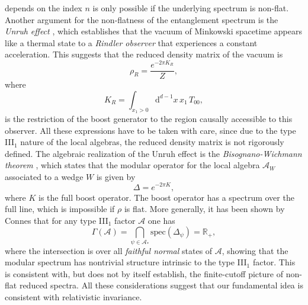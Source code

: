 \documentclass[aps,pra,reprint,superscriptaddress]{revtex4-2}
\newcommand{\cA}{{\mathcal A}}
\newcommand\D{\Delta}
\newcommand\G{\Gamma}
\renewcommand\r{\rho}
\newcommand\y{\psi}
\theoremstyle{definition}
\theoremstyle{remark}
\begin{document}
depends on the index $n$ is only possible if the underlying spectrum is
non-flat. Another argument for the non-flatness of the entanglement spectrum is
the \emph{Unruh effect} \cite{Unruh:1976db}, which establishes that the vacuum of
Minkowski spacetime appears like a thermal state to a \emph{Rindler observer} that
experiences a constant acceleration.
This suggests that the reduced density matrix 
of the vacuum is
\begin{equation}
    \r_R = \frac{e^{-2 \pi K_R}}{Z},
\end{equation}
where
\begin{equation}
    K_R = \int_{x_1>0} \text{d}^{d-1}x\, x_1\, T_{00},
\end{equation}
is the restriction of the boost generator to the region causally accessible to
this observer. All these expressions have to be taken with care, since due to
the type III$_1$ nature of the local algebras, the reduced density matrix is
not rigorously defined. The algebraic realization of the Unruh effect is the \emph{Bisognano-Wichmann
theorem} \cite{Bisognano:1976za}, which states that the modular operator for the local algebra $\cA_W$ associated to a wedge $W$
is given by
\begin{equation}
    \D = e^{-2\pi K},
\end{equation}
where $K$ is the full boost operator. The boost operator has a spectrum over
the full line, which is impossible if $\r$ is flat. More generally, it has been
shown by Connes \cite{Connes:1971,Connes:1973} that for any type III$_1$
factor $\cA$ one has
\begin{equation}
    \G(\cA) = \bigcap_{\y \in \cA_*} \mathrm{spec}(\D_\y) = \mathbb{R}_+,
\end{equation}
where the intersection is over all \emph{faithful normal} states of $\cA$,
showing that the modular spectrum has nontrivial structure intrinsic to the type III$_1$ factor. This is consistent with, but does not by itself establish, the finite-cutoff picture of non-flat reduced spectra.
All these considerations suggest that our fundamental idea is
consistent with relativistic invariance.
\end{document}
